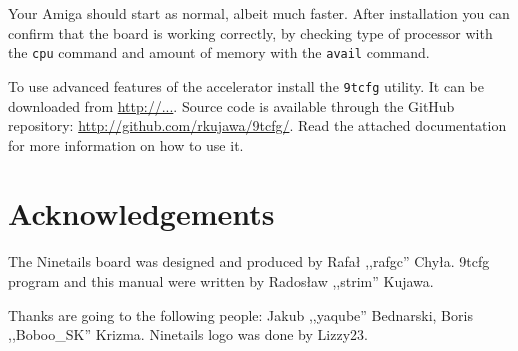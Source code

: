 \documentclass[10pt,a4paper]{article}
\begin{document}
Your Amiga should start as normal, albeit much faster. After installation you can confirm that the board is working correctly, by checking type of processor with the {\tt cpu} command and amount of memory with the {\tt avail} command.

To use advanced features of the accelerator install the {\tt 9tcfg} utility. It can be downloaded from \url{http://...}. Source code is available through the GitHub repository: \url{http://github.com/rkujawa/9tcfg/}. Read the attached documentation for more information on how to use it. 

\section*{Acknowledgements}

The Ninetails board was designed and produced by Rafał ,,rafgc'' Chyła. 9tcfg program and this manual were written by Radosław ,,strim'' Kujawa.

Thanks are going to the following people: Jakub ,,yaqube'' Bednarski, Boris ,,Boboo\_SK'' Krizma. Ninetails logo was done by Lizzy23.
\end{document}
